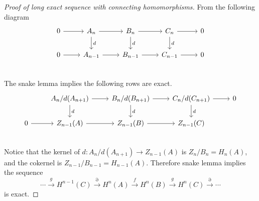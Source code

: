 \begin{proof}[Proof of long exact sequence with connecting homomorphisms] From the following diagram
\begin{equation}
\begin{tikzcd}
0\arrow{r} &A_n\arrow{r} \arrow{d}{d}&B_n\arrow{r} \arrow{d}{d}&C_n\arrow{r} \arrow{d}{d}&0\\
0\arrow{r} &A_{n-1}\arrow{r}&B_{n-1}\arrow{r}&C_{n-1}\arrow{r}&0\\
\end{tikzcd}
\end{equation}
The snake lemma implies the following rows are exact.
\begin{equation}
\begin{tikzcd}
 &A_n/d(A_{n+1})\arrow{r} \arrow{d}{d}&B_n/d(B_{n+1})\arrow{r} \arrow{d}{d}&C_n/d(C_{n+1})\arrow{r} \arrow{d}{d}&0\\
0\arrow{r} &Z_{n-1}(A)\arrow{r}&Z_{n-1}(B)\arrow{r}&Z_{n-1}(C)&\\
\end{tikzcd}
\end{equation}
Notice that the kernel of $d:A_n/d(A_{n+1})\rightarrow Z_{n-1}(A)$ is $Z_n/B_n=H_n(A)$, and the cokernel is $Z_{n-1}/B_{n-1}=H_{n-1}(A)$. Therefore snake lemma implies the sequence
\begin{equation}
\cdots\xrightarrow{g}H^{n-1}(C)\xrightarrow{\partial}H^n(A)\xrightarrow{f}H^n(B)\xrightarrow{g}H^n(C)\xrightarrow{\partial}\cdots
\end{equation}
is exact.
\end{proof}

